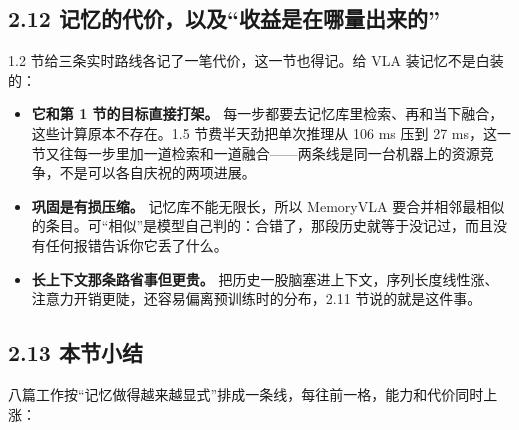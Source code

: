 \documentclass[
  chinese,
]{ctexart}
\providecommand{\tightlist}{%
  \setlength{\itemsep}{0pt}\setlength{\parskip}{0pt}}
\begin{document}
\subsection{2.12
记忆的代价，以及``收益是在哪量出来的''}\label{ux8bb0ux5fc6ux7684ux4ee3ux4ef7ux4ee5ux53caux6536ux76caux662fux5728ux54eaux91cfux51faux6765ux7684}

1.2 节给三条实时路线各记了一笔代价，这一节也得记。给 VLA
装记忆不是白装的：

\begin{itemize}
\tightlist
\item
  \textbf{它和第 1 节的目标直接打架。}
  每一步都要去记忆库里检索、再和当下融合，这些计算原本不存在。1.5
  节费半天劲把单次推理从 106 ms 压到 27
  ms，这一节又往每一步里加一道检索和一道融合------两条线是同一台机器上的资源竞争，不是可以各自庆祝的两项进展。
\item
  \textbf{巩固是有损压缩。} 记忆库不能无限长，所以 MemoryVLA
  要合并相邻最相似的条目。可``相似''是模型自己判的：合错了，那段历史就等于没记过，而且没有任何报错告诉你它丢了什么。
\item
  \textbf{长上下文那条路省事但更贵。}
  把历史一股脑塞进上下文，序列长度线性涨、注意力开销更陡，还容易偏离预训练时的分布，2.11
  节说的就是这件事。
\end{itemize}

\subsection{2.13 本节小结}\label{ux672cux8282ux5c0fux7ed3-1}

八篇工作按``记忆做得越来越显式''排成一条线，每往前一格，能力和代价同时上涨：
\end{document}
